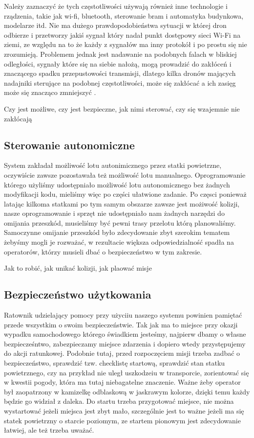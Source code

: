 Należy zaznaczyć że tych częstotliwości używają również inne technologie i rządzenia, takie jak wi-fi, bluetooth, sterowanie bram i automatyka budynkowa, modelarze itd. Nie ma dużego prawdopodobieństwa sytuacji w której dron odbierze i przetworzy jakiś sygnał który nadał punkt dostępowy sieci Wi-Fi na ziemi, ze względu na to że każdy z sygnałów ma inny protokół i po prostu się nie zrozumieją. Problemem jednak jest nadawanie na podobnych falach w bliskiej odległości, sygnały które się na siebie nałożą, mogą prowadzić do zakłóceń i znaczącego spadku przepustowości transmisji, dlatego kilka dronów mających nadajniki sterujące na podobnej częstotliwości, może się zakłócać a ich zasięg może się znacząco zmniejszyć \cite{radiointerference}.

Czy jest możliwe, czy jest bezpieczne, jak nimi sterować, czy się wzajemnie nie zakłócają
\subsection{Sterowanie autonomiczne}

System zakładał możliwość lotu autonimicznego przez statki powietrzne, oczywiście zawsze pozostawała też możliwość lotu manualnego. Oprogramowanie którego użyliśmy udostępniało możliwość lotu autonomicznego bez żadnych modyfikacji kodu, mieliśmy więc po części ułatwione zadanie. Po częsci ponieważ latając kilkoma statkami po tym samym obszarze zawsze jest możiwość kolizji, nasze oprogramowanie i sprzęt nie udostępniało nam żadnych narzędzi do omijania przeszkód, musieliśmy być pewni trasy przelotu którą planowaliśmy. Samoczynne omijanie przeszkód było zdecydowanie zbyt szerokim tematem żebyśmy mogli je rozważać, w rezultacie większa odpowiedzialność spadła na operatorów, którzy musieli dbać o bezpieczeństwo w tym zakresie.


Jak to robić, jak unikać kolizji, jak plaować misje
\subsection{Bezpieczeństwo użytkowania}

Ratownik udzielający pomocy przy użyciiu naszego systemu powinien pamiętać przede wszystkim o swoim bezpieczeństwie. Tak jak ma to miejsce przy okazji wypadku samochodowego którego świadkiem jesteśmy, najpierw dbamy o własne bezpiecześntwo, zabezpieczamy miejsce zdarzenia i dopiero wtedy przystępujemy do akcji ratunkowej. Podobnie tutaj, przed rozpoczęciem misji trzeba zadbać o bezpieczeństwo, sprawdzić tzw. checklistę startową, sprawdzić stan statku powietrznego, czy na przykład nie uległ uszkodzeiu w transporcie, zorientować się w kwestii pogody, która ma tutaj niebagatelne znaczenie. Ważne żeby operator był zaopatrzony w kamizelkę odblaskową w jaskrawym kolorze, dzięki temu każdy będzie go widział z daleka. Do startu trzeba przygotować miejsce, nie można wystartować jeżeli miejsca jest zbyt mało, szczególnie jest to ważne jeżeli ma się statek powietrzny o starcie poziomym, ze startem pionowym jest zdecydowanie łatwiej, ale też trzeba uważać. 


